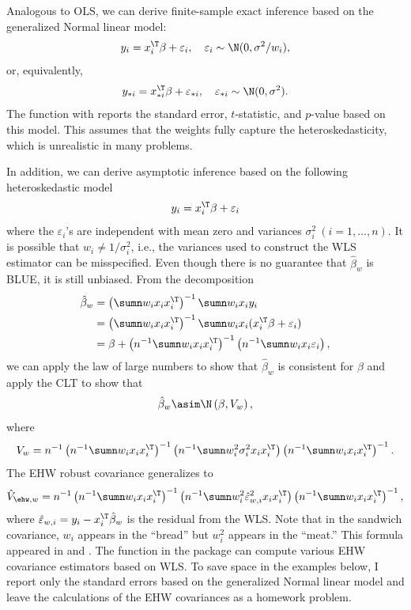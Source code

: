 Analogous to OLS, we can derive finite-sample exact inference based on the generalized Normal linear model:
$$
y_{i}=x_{i}^{\T}\beta+\varepsilon_{i},\quad \varepsilon_{i} \sim \N(0, \sigma^2/w_i),
$$
or, equivalently,
$$
y_{*i} = x_{*i}^{\T}\beta+ \varepsilon_{*i},\quad \varepsilon_{*i} \sim \N(0, \sigma^2).
$$
The  function with  reports the standard error, $t$-statistic, and $p$-value based on this model. This assumes that the weights fully capture the heteroskedasticity, which is unrealistic in many problems. 

In addition, we can derive asymptotic inference based on the following heteroskedastic model
\[
y_{i}=x_{i}^{\T}\beta+\varepsilon_{i}
\]
where the $\varepsilon_{i}$'s are independent with mean zero and
variances $\sigma_{i}^{2}\ (i=1,\ldots,n)$. It is possible that $w_{i}\neq1/\sigma_{i}^{2}$,
i.e., the variances used to construct the WLS estimator can be misspecified.
Even though there is no guarantee that $\hat{\beta}_{w}$ is BLUE,
it is still unbiased. From the decomposition
\begin{align*}
\hat{\beta}_{w} & =\left(\sumn w_{i}x_{i}x_{i}^{\T}\right)^{-1}\sumn w_{i}x_{i}y_{i}\\
 & =\left(\sumn w_{i}x_{i}x_{i}^{\T}\right)^{-1}\sumn w_{i}x_{i}(x_{i}^{\T}\beta+\varepsilon_{i})\\
 & =\beta+\left(n^{-1}\sumn w_{i}x_{i}x_{i}^{\T}\right)^{-1}\left(n^{-1}\sumn w_{i}x_{i}\varepsilon_{i}\right),
\end{align*}
we can apply the law of large numbers to show that $\hat{\beta}_{w}$
is consistent for $\beta$ and apply the CLT to
show that 
\[
\hat{\beta}_{w}\asim\N\left(\beta,V_w\right),
\]
where 
\[
V_w  = n^{-1}\left(n^{-1}\sumn w_{i}x_{i}x_{i}^{\T}\right)^{-1}\left(n^{-1}\sumn w_{i}^{2}\sigma_{i}^{2}x_{i}x_{i}^{\T}\right)\left(n^{-1}\sumn w_{i}x_{i}x_{i}^{\T}\right)^{-1}. 
\]
The EHW robust covariance generalizes to
\[
\hat{V}_{\ehw, w}=n^{-1}\left(n^{-1}\sumn w_{i}x_{i}x_{i}^{\T}\right)^{-1}\left(n^{-1}\sumn w_{i}^{2}\hat{\varepsilon}_{w,i}^{2}x_{i}x_{i}^{\T}\right)\left(n^{-1}\sumn w_{i}x_{i}x_{i}^{\T}\right)^{-1},
\]
where $\hat{\varepsilon}_{w,i}=y_{i}-x_{i}^{\T}\hat{\beta}_{w}$ is
the residual from the WLS. Note that in the sandwich covariance, $w_{i}$
appears in the ``bread'' but $w_{i}^{2}$ appears in the ``meat.'' This formula appeared in \citet{magee1998improving} and \citet{romano2017resurrecting}. The  function
 in the 
 package  can compute various EHW covariance estimators based on WLS. To save space in the examples below, I report only the standard errors based on the generalized Normal linear model and leave the calculations of the EHW covariances as a homework problem. 





